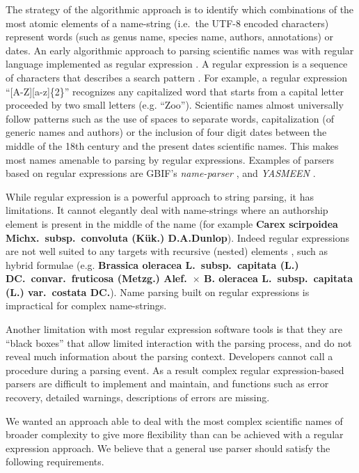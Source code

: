 \documentclass{bmcart}
\begin{document}
The strategy of the algorithmic approach is to identify which combinations of
the most atomic elements of a name-string (i.e.\ the UTF-8 encoded characters)
represent words (such as genus name, species name, authors, annotations) or
dates.  An early algorithmic approach to parsing scientific names was with
regular language implemented as regular expression \cite{Leary2007}. A regular
expression is a sequence of characters that describes a search pattern
\cite{aho1992foundations}. For example, a regular expression
``[A-Z][a-z]\{2\}'' recognizes any capitalized word that starts from a capital
letter proceeded by two small letters (e.g. ``Zoo''). Scientific names almost
universally follow patterns such as the use of spaces to separate words,
capitalization (of generic names and authors) or the inclusion of four digit
dates between the middle of the 18th century and the present dates scientific
names. This makes most names amenable to parsing by regular expressions.
Examples of parsers based on regular expressions are GBIF's
\textit{name-parser} \cite{gbifNameParser}, and \textit{YASMEEN}
\cite{VandenBerghe2015}.

While regular expression is a powerful approach to string parsing,  it has
limitations. It cannot elegantly deal with name-strings where an authorship
element is present in the middle of the name (for example \textbf{Carex
scirpoidea Michx.\ subsp.\ convoluta (Kük.) D.A.Dunlop}).  Indeed regular
expressions are not well suited to any targets with recursive (nested) elements
\cite{yu1997handbook}, such as hybrid formulae (e.g. \textbf{Brassica oleracea
L.\ subsp.\ capitata (L.) DC.\ convar.\ fruticosa (Metzg.) Alef.\  $\times$ B.
oleracea L.\ subsp.\ capitata (L.) var.\  costata DC.}). Name parsing built on
regular expressions is impractical for complex name-strings.

Another limitation with most regular expression software tools is that they are
``black boxes'' that allow limited interaction with the parsing process, and do
not reveal much information about the parsing context. Developers cannot call a
procedure during a parsing event. As a result complex regular expression-based
parsers are difficult to implement and maintain, and functions such as error
recovery, detailed warnings, descriptions of errors are missing.

We wanted an approach able to deal with the most complex scientific names of
broader complexity to give more flexibility than can be achieved with a regular
expression approach.  We believe that a general use parser should satisfy the
following requirements.
\end{document}
